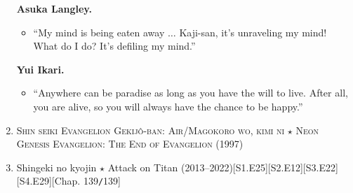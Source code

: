 \documentclass{article}
\begin{document}
\begin{enumerate}
	\textbf{Asuka Langley.}
	\begin{itemize}
		\item ``My mind is being eaten away $\ldots$ Kaji-san, it's unraveling my mind! What do I do? It's defiling my mind.''
	\end{itemize}
	\textbf{Yui Ikari.}
	\begin{itemize}
		\item ``Anywhere can be paradise as long as you have the will to live. After all, you are alive, so you will always have the chance to be happy.''
	\end{itemize}
    \item \textsc{Shin seiki Evangelion Gekijô-ban: Air/Magokoro wo, kimi ni $\star$ Neon Genesis Evangelion: The End of Evangelion} (1997)
    \item Shingeki no kyojin $\star$ Attack on Titan (2013--2022)\hfill[S1.E25][S2.E12][S3.E22][S4.E29][Chap. 139\texttt{/}139]
    

\end{enumerate}
\end{document}
